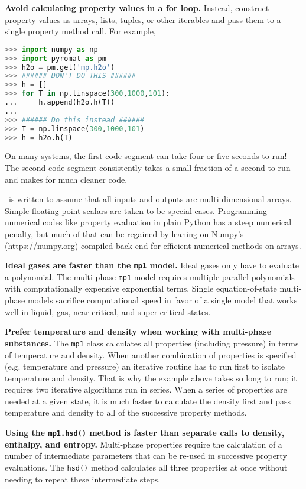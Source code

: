{\bf Avoid calculating property values in a for loop.}  Instead, construct property values as arrays, lists, tuples, or other iterables and pass them to a single property method call.  For example,
\begin{lstlisting}[language=Python]
>>> import numpy as np
>>> import pyromat as pm
>>> h2o = pm.get('mp.h2o')
>>> ###### DON'T DO THIS ######
>>> h = []
>>> for T in np.linspace(300,1000,101):
...     h.append(h2o.h(T))
... 
>>> ###### Do this instead ######
>>> T = np.linspace(300,1000,101)
>>> h = h2o.h(T)
\end{lstlisting}
On many systems, the first code segment can take four or five seconds to run!  The second code segment consistently takes a small fraction of a second to run and makes for much cleaner code.

\PM\ is written to assume that all inputs and outputs are multi-dimensional arrays.  Simple floating point scalars are taken to be special cases.  Programming numerical codes like property evaluation in plain Python has a steep numerical penalty, but much of that can be regained by leaning on Numpy's (\url{https://numpy.org}) compiled back-end for efficient numerical methods on arrays.

{\bf Ideal gases are faster than the \texttt{mp1} model.}  Ideal gases only have to evaluate a polynomial.  The multi-phase \texttt{mp1} model requires multiple parallel polynomials with computationally expensive exponential terms.  Single equation-of-state multi-phase models sacrifice computational speed in favor of a single model that works well in liquid, gas, near critical, and super-critical states.

{\bf Prefer temperature and density when working with multi-phase substances.}  The \texttt{mp1} class calculates all properties (including pressure) in terms of temperature and density.  When another combination of properties is specified (e.g. temperature and pressure) an iterative routine has to run first to isolate temperature and density.  That is why the example above takes so long to run; it requires two iterative algorithms run in series.  When a series of properties are needed at a given state, it is much faster to calculate the density first and pass temperature and density to all of the successive property methods.

{\bf Using the \texttt{mp1.hsd()} method is faster than separate calls to density, enthalpy, and entropy.}  Multi-phase properties require the calculation of a number of intermediate parameters that can be re-used in successive property evaluations.  The \texttt{hsd()} method calculates all three properties at once without needing to repeat these intermediate steps.

